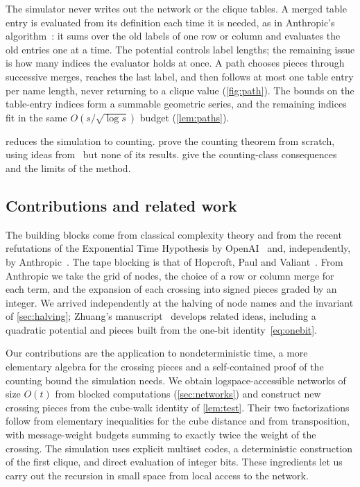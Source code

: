 \documentclass[11pt]{article}
\theoremstyle{definition}
\theoremstyle{definition}
\theoremstyle{remark}
\begin{document}
The simulator never writes out the network or the clique tables. A merged table entry is evaluated from its definition each time it is needed, as in Anthropic's algorithm~\cite[Algorithm~1]{Ant26}: it sums over the old labels of one row or column and evaluates the old entries one at a time. The potential controls label lengths; the remaining issue is how many indices the evaluator holds at once. A path chooses pieces through successive merges, reaches the last label, and then follows at most one table entry per name length, never returning to a clique value (\cref{fig:path}). The bounds on the table-entry indices form a summable geometric series, and the remaining indices fit in the same $O(s/\sqrt{\log s})$ budget (\cref{lem:paths}).

 reduces the simulation to counting.  prove the counting theorem from scratch, using ideas from~\cite{Ant26} but none of its results.  give the counting-class consequences and the limits of the method.

\subsection{Contributions and related work}

The building blocks come from classical complexity theory and from the recent refutations of the Exponential Time Hypothesis by OpenAI~\cite{Ope26} and, independently, by Anthropic~\cite{Ant26}. The tape blocking is that of Hopcroft, Paul and Valiant~\cite{HPV77}. From Anthropic we take the grid of nodes, the choice of a row or column merge for each term, and the expansion of each crossing into signed pieces graded by an integer. We arrived independently at the halving of node names and the invariant of \cref{sec:halving}; Zhuang's manuscript~\cite{Zhu26} develops related ideas, including a quadratic potential and pieces built from the one-bit identity~\eqref{eq:onebit}.

Our contributions are the application to nondeterministic time, a more elementary algebra for the crossing pieces and a self-contained proof of the counting bound the simulation needs. We obtain logspace-accessible networks of size $O(t)$ from blocked computations (\cref{sec:networks}) and construct new crossing pieces from the cube-walk identity of \cref{lem:test}. Their two factorizations follow from elementary inequalities for the cube distance and from transposition, with message-weight budgets summing to exactly twice the weight of the crossing. The simulation uses explicit multiset codes, a deterministic construction of the first clique, and direct evaluation of integer bits. These ingredients let us carry out the recursion in small space from local access to the network.
\end{document}
